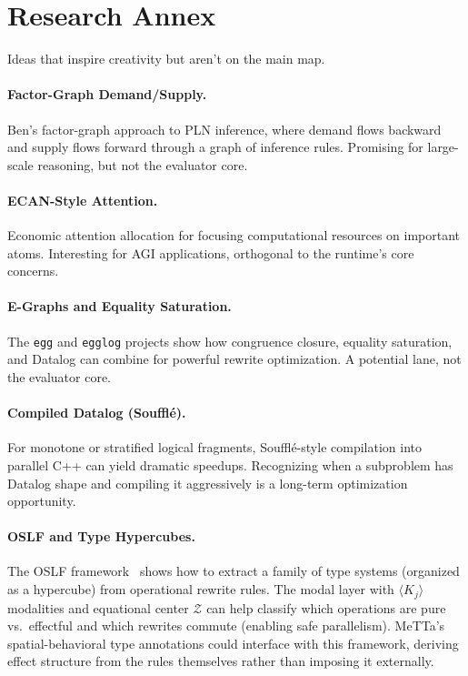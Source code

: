 \documentclass[11pt]{article}
\newcommand{\code}[1]{\texttt{#1}}
\begin{document}
\appendix
\section{Research Annex}
\label{sec:research}

Ideas that inspire creativity but aren't on the main map.

\paragraph{Factor-Graph Demand/Supply.}
Ben's factor-graph approach to PLN inference, where demand flows backward
and supply flows forward through a graph of inference rules.  Promising
for large-scale reasoning, but not the evaluator core.

\paragraph{ECAN-Style Attention.}
Economic attention allocation for focusing computational resources on
important atoms.  Interesting for AGI applications, orthogonal to the
runtime's core concerns.

\paragraph{E-Graphs and Equality Saturation.}
The \code{egg} and \code{egglog} projects show how congruence closure,
equality saturation, and Datalog can combine for powerful rewrite
optimization.  A potential lane, not the evaluator core.

\paragraph{Compiled Datalog (Soufflé).}
For monotone or stratified logical fragments, Soufflé-style compilation
into parallel C++ can yield dramatic speedups.  Recognizing when a
subproblem has Datalog shape and compiling it aggressively is a
long-term optimization opportunity.

\paragraph{OSLF and Type Hypercubes.}
The OSLF framework~\cite{OSLF2026} shows how to extract a family of type
systems (organized as a hypercube) from operational rewrite rules.  The
modal layer with $\langle K_j \rangle$ modalities and equational center
$\mathcal{Z}$ can help classify which operations are pure vs.\ effectful
and which rewrites commute (enabling safe parallelism).  MeTTa's
spatial-behavioral type annotations could interface with this framework,
deriving effect structure from the rules themselves rather than imposing
it externally.
\end{document}
